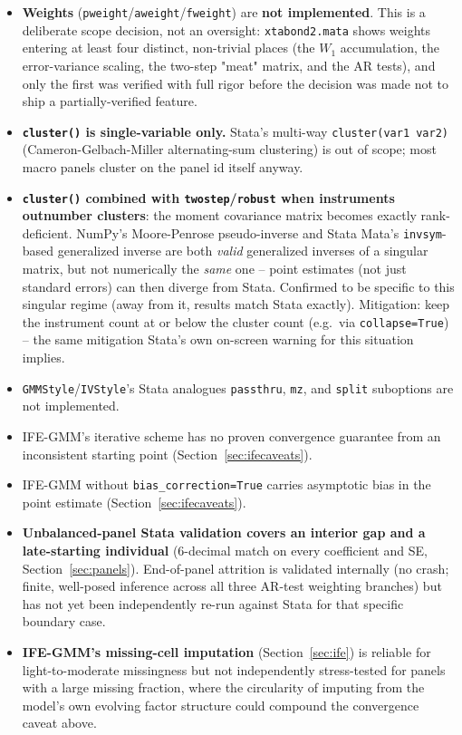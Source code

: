 \documentclass[11pt,a4paper]{article}
\begin{document}
\begin{itemize}[nosep]
  \item \textbf{Weights} (\texttt{pweight}/\texttt{aweight}/\texttt{fweight})
    are \textbf{not implemented}. This is a deliberate scope decision, not an
    oversight: \texttt{xtabond2.mata} shows weights entering at least four
    distinct, non-trivial places (the $W_1$ accumulation, the
    error-variance scaling, the two-step "meat" matrix, and the AR tests),
    and only the first was verified with full rigor before the decision was
    made not to ship a partially-verified feature.
  \item \textbf{\texttt{cluster()} is single-variable only.} Stata's
    multi-way \texttt{cluster(var1 var2)} (Cameron-Gelbach-Miller
    alternating-sum clustering) is out of scope; most macro panels cluster
    on the panel id itself anyway.
  \item \textbf{\texttt{cluster()} combined with \texttt{twostep}/\texttt{robust}
    when instruments outnumber clusters}: the moment covariance matrix
    becomes exactly rank-deficient. NumPy's Moore-Penrose pseudo-inverse and
    Stata Mata's \texttt{invsym}-based generalized inverse are both
    \emph{valid} generalized inverses of a singular matrix, but not
    numerically the \emph{same} one -- point estimates (not just standard
    errors) can then diverge from Stata. Confirmed to be specific to this
    singular regime (away from it, results match Stata exactly). Mitigation:
    keep the instrument count at or below the cluster count (e.g.\ via
    \texttt{collapse=True}) -- the same mitigation Stata's own on-screen
    warning for this situation implies.
  \item \texttt{GMMStyle}/\texttt{IVStyle}'s Stata analogues
    \texttt{passthru}, \texttt{mz}, and \texttt{split} suboptions are not
    implemented.
  \item IFE-GMM's iterative scheme has no proven convergence guarantee from
    an inconsistent starting point (Section~\ref{sec:ifecaveats}).
  \item IFE-GMM without \texttt{bias\_correction=True} carries asymptotic
    bias in the point estimate (Section~\ref{sec:ifecaveats}).
  \item \textbf{Unbalanced-panel Stata validation covers an interior gap and
    a late-starting individual} (6-decimal match on every coefficient and
    SE, Section~\ref{sec:panels}). End-of-panel attrition is validated
    internally (no crash; finite, well-posed inference across all three
    AR-test weighting branches) but has not yet been independently re-run
    against Stata for that specific boundary case.
  \item \textbf{IFE-GMM's missing-cell imputation} (Section~\ref{sec:ife})
    is reliable for light-to-moderate missingness but not independently
    stress-tested for panels with a large missing fraction, where the
    circularity of imputing from the model's own evolving factor structure
    could compound the convergence caveat above.
\end{itemize}
\end{document}

